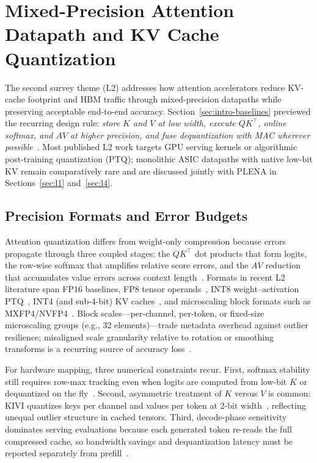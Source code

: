 \documentclass[conference]{IEEEtran}
\begin{document}
\section{Mixed-Precision Attention Datapath and KV Cache Quantization}
\label{sec:l2}

The second survey theme (L2) addresses how attention accelerators reduce KV-cache footprint and HBM traffic through mixed-precision datapaths while preserving acceptable end-to-end accuracy.
Section~\ref{sec:intro-baselines} previewed the recurring design rule: \emph{store $K$ and $V$ at low width, execute $QK^\top$, online softmax, and $AV$ at higher precision, and fuse dequantization with MAC wherever possible}~\cite{liu2024kivi,sawint42026,bitdecoding2026,plena2025}.
Most published L2 work targets GPU serving kernels or algorithmic post-training quantization (PTQ); monolithic ASIC datapaths with native low-bit KV remain comparatively rare and are discussed jointly with PLENA in Sections~\ref{sec:l1} and~\ref{sec:l4}.

\subsection{Precision Formats and Error Budgets}
\label{sec:l2-formats}

Attention quantization differs from weight-only compression because errors propagate through three coupled stages: the $QK^\top$ dot products that form logits, the row-wise softmax that amplifies relative score errors, and the $AV$ reduction that accumulates value errors across context length~\cite{dao2022flashattention,micikevicius2022fp8,bitdecoding2026}.
Formats in recent L2 literature span FP16 baselines, FP8 tensor operands~\cite{micikevicius2022fp8,shah2024flashattention3}, INT8 weight--activation PTQ~\cite{xiao2023smoothquant}, INT4 (and sub-4-bit) KV caches~\cite{liu2024kivi,sawint42026}, and microscaling block formats such as MXFP4/NVFP4~\cite{bitdecoding2026,batquant2026}.
Block scales---per-channel, per-token, or fixed-size microscaling groups (e.g., 32 elements)---trade metadata overhead against outlier resilience; misaligned scale granularity relative to rotation or smoothing transforms is a recurring source of accuracy loss~\cite{ashkboos2024quarot,batquant2026,ultraquant2026}.

For hardware mapping, three numerical constraints recur.
First, softmax stability still requires row-max tracking even when logits are computed from low-bit $K$ or dequantized on the fly~\cite{lin2025systolicattention,liu2024kivi}.
Second, asymmetric treatment of $K$ versus $V$ is common: KIVI quantizes keys per channel and values per token at 2-bit width~\cite{liu2024kivi}, reflecting unequal outlier structure in cached tensors.
Third, decode-phase sensitivity dominates serving evaluations because each generated token re-reads the full compressed cache, so bandwidth savings and dequantization latency must be reported separately from prefill~\cite{bitdecoding2026,sawint42026,ultraquant2026,dao2023flashdecoding}.
\end{document}
